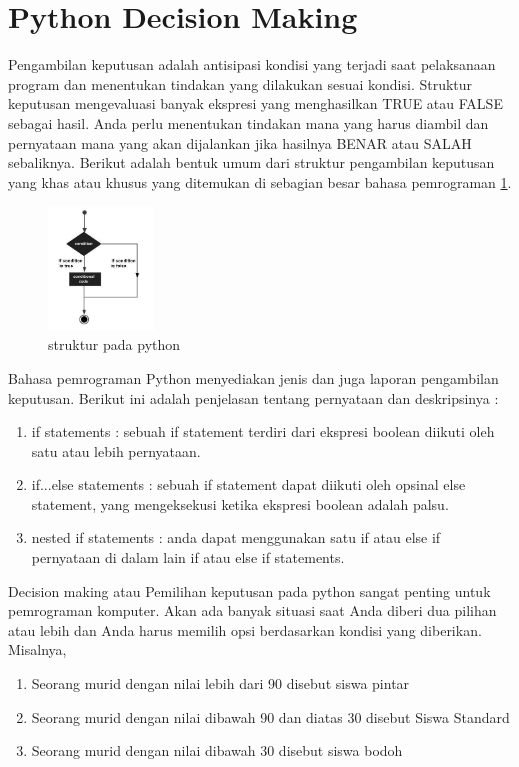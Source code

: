\section{Python Decision Making}
Pengambilan keputusan adalah antisipasi kondisi yang terjadi saat pelaksanaan program dan menentukan tindakan yang dilakukan sesuai kondisi. 
Struktur keputusan mengevaluasi banyak ekspresi yang menghasilkan TRUE atau FALSE sebagai hasil.   Anda perlu menentukan tindakan mana yang harus diambil dan pernyataan mana yang akan dijalankan jika hasilnya BENAR atau SALAH sebaliknya. 
Berikut adalah bentuk umum dari struktur pengambilan keputusan yang khas atau khusus yang ditemukan di sebagian besar bahasa pemrograman
\ref{diagramstruktur}.
\begin{figure}[ht]
    \centerline{\includegraphics[width=0.25\textwidth]{figures/struktur}}
    \caption{struktur pada python}
    \label{diagramstruktur}
    \end{figure}
Bahasa pemrograman Python menyediakan jenis dan juga laporan pengambilan keputusan. Berikut ini adalah penjelasan tentang pernyataan dan deskripsinya :
\begin{enumerate}
\item
if statements : sebuah if statement terdiri dari ekspresi boolean diikuti oleh satu atau lebih pernyataan. 
\item
if...else statements : sebuah if statement dapat diikuti oleh opsinal else statement, yang mengeksekusi ketika ekspresi boolean adalah palsu. 
\item
nested if statements : anda dapat menggunakan satu if atau else if pernyataan di dalam lain if atau else if statements. 
\end{enumerate}
Decision making atau Pemilihan keputusan pada python sangat penting untuk pemrograman komputer. Akan ada banyak situasi saat Anda diberi dua pilihan atau lebih dan Anda harus memilih opsi berdasarkan kondisi yang diberikan. Misalnya,
\begin{enumerate} 
\item
Seorang murid dengan nilai lebih dari 90 disebut siswa pintar 
\item
Seorang murid dengan nilai dibawah 90 dan diatas 30 disebut Siswa Standard 
\item
Seorang murid dengan nilai dibawah 30 disebut siswa bodoh 
\end{enumerate}

